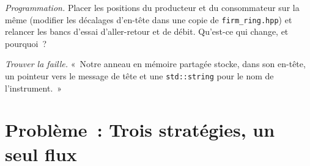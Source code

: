 \begin{exercise}[$\star\star\star$]\label{exo:ll:queues-ring-buffers-and-shared-memory:7}
\emph{Programmation.} Placer les positions du producteur et du consommateur sur la même  (modifier les décalages d'en-tête dans une copie de
\texttt{firm\_ring.hpp}) et relancer les bancs d'essai d'aller-retour et de débit. Qu'est-ce qui change, et pourquoi~?
\end{exercise}

\begin{exercise}[$\star\star\star$]\label{exo:ll:queues-ring-buffers-and-shared-memory:8}
\emph{Trouver la faille.} «~Notre anneau en mémoire partagée stocke, dans son en-tête, un pointeur vers le message de tête et une \texttt{std::string} pour le
nom de l'instrument.~»
\end{exercise}

\section{Problème~: Trois stratégies, un seul flux}

